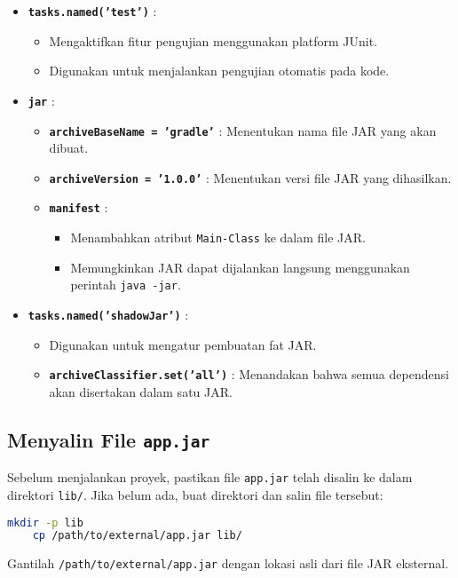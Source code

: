 \begin{itemize}
	\item \textbf{\texttt{tasks.named('test')}} :
	\begin{itemize}
		\item Mengaktifkan fitur pengujian menggunakan platform JUnit.
		\item Digunakan untuk menjalankan pengujian otomatis pada kode.
	\end{itemize}
	
	\item \textbf{\texttt{jar}} :
	\begin{itemize}
		\item \textbf{\texttt{archiveBaseName = 'gradle'}} : Menentukan nama file JAR yang akan dibuat.
		\item \textbf{\texttt{archiveVersion = '1.0.0'}} : Menentukan versi file JAR yang dihasilkan.
		\item \textbf{\texttt{manifest}} :
		\begin{itemize}
			\item Menambahkan atribut \texttt{Main-Class} ke dalam file JAR.
			\item Memungkinkan JAR dapat dijalankan langsung menggunakan perintah \texttt{java -jar}.
		\end{itemize}
	\end{itemize}
	
	\item \textbf{\texttt{tasks.named('shadowJar')}} :
	\begin{itemize}
		\item Digunakan untuk mengatur pembuatan fat JAR.
		\item \textbf{\texttt{archiveClassifier.set('all')}} : Menandakan bahwa semua dependensi akan disertakan dalam satu JAR.
	\end{itemize}
\end{itemize}


\subsection{Menyalin File \texttt{app.jar}}
Sebelum menjalankan proyek, pastikan file \texttt{app.jar} telah disalin ke dalam direktori \texttt{lib/}. Jika belum ada, buat direktori dan salin file tersebut:

\begin{lstlisting}[language=bash]
	mkdir -p lib
	cp /path/to/external/app.jar lib/
\end{lstlisting}

Gantilah \texttt{/path/to/external/app.jar} dengan lokasi asli dari file JAR eksternal.

